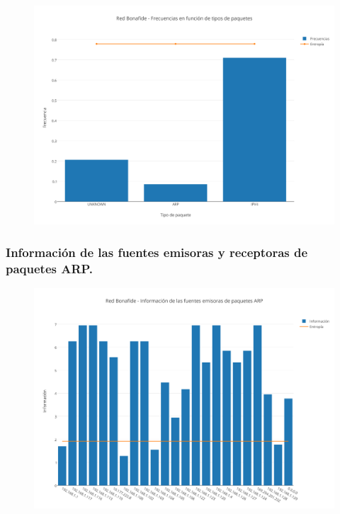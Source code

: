 \begin{figure}[h!]
    \centering                                                       
    \includegraphics[width=400pt]{img/BonafideFrecuenciaVsTipoPaquetes}
    \caption{}
    \label{bonafidePaquetes}
\end{figure}

\subsubsection{Informaci\'on de las fuentes emisoras y receptoras de paquetes ARP.}

\begin{figure}[h!]
    \centering                                                       
    \includegraphics[width=400pt]{img/RedBonafideFuentesEmisorasARP}
    \caption{}
    \label{bonafideEmisoras}
\end{figure}

